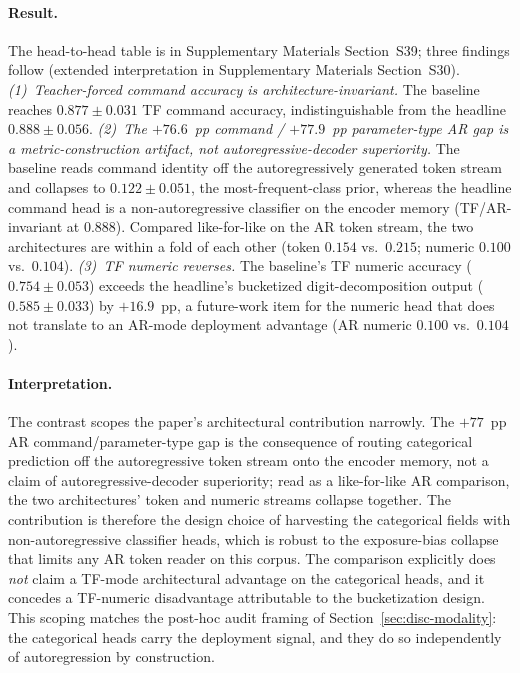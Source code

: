 \documentclass[sensors,article,submit,moreauthors,pdftex]{Definitions/mdpi}
\begin{document}
\paragraph{Result.} The head-to-head table is in Supplementary Materials Section~S39; three findings follow (extended interpretation in Supplementary Materials Section~S30). \emph{(1)~Teacher-forced command accuracy is architecture-invariant.} The baseline reaches $0.877 \pm 0.031$ TF command accuracy, indistinguishable from the headline $0.888 \pm 0.056$. \emph{(2)~The $+76.6$~pp command / $+77.9$~pp parameter-type AR gap is a metric-construction artifact, not autoregressive-decoder superiority.} The baseline reads command identity off the autoregressively generated token stream and collapses to $0.122 \pm 0.051$, the most-frequent-class prior, whereas the headline command head is a non-autoregressive classifier on the encoder memory (TF/AR-invariant at $0.888$). Compared like-for-like on the AR token stream, the two architectures are within a fold of each other (token $0.154$ vs.\ $0.215$; numeric $0.100$ vs.\ $0.104$). \emph{(3)~TF numeric reverses.} The baseline's TF numeric accuracy ($0.754 \pm 0.053$) exceeds the headline's bucketized digit-decomposition output ($0.585 \pm 0.033$) by $+16.9$~pp, a future-work item for the numeric head that does not translate to an AR-mode deployment advantage (AR numeric $0.100$ vs.\ $0.104$).

\paragraph{Interpretation.} The contrast scopes the paper's architectural contribution narrowly. The $+77$~pp AR command/parameter-type gap is the consequence of routing categorical prediction off the autoregressive token stream onto the encoder memory, not a claim of autoregressive-decoder superiority; read as a like-for-like AR comparison, the two architectures' token and numeric streams collapse together. The contribution is therefore the design choice of harvesting the categorical fields with non-autoregressive classifier heads, which is robust to the exposure-bias collapse that limits any AR token reader on this corpus. The comparison explicitly does \emph{not} claim a TF-mode architectural advantage on the categorical heads, and it concedes a TF-numeric disadvantage attributable to the bucketization design. This scoping matches the post-hoc audit framing of Section~\ref{sec:disc-modality}: the categorical heads carry the deployment signal, and they do so independently of autoregression by construction.
\end{document}
